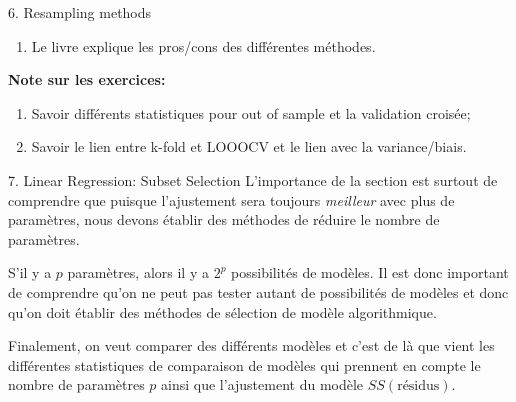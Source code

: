 \documentclass[12pt, titlepage, french]{report}
\begin{document}
\begin{CHPT_SUMM}{6. Resampling methods}
\begin{enumerate}
\begin{enumerate}
\begin{enumerate}
		\end{enumerate}
	\end{enumerate}
	\item	Le livre explique les pros/cons des différentes méthodes.
\end{enumerate}
\textbf{Note sur les exercices:} 
\begin{enumerate}
	\item	Savoir différents statistiques pour out of sample et la validation croisée;
	\item	Savoir le lien entre k-fold et LOOOCV et le lien avec la variance/biais.
\end{enumerate}
\end{CHPT_SUMM}

\begin{CHPT_SUMM}{7. Linear Regression:  Subset Selection}
L'importance de la section est surtout de comprendre que puisque l'ajustement sera toujours \textit{meilleur} avec plus de paramètres, nous devons établir des méthodes de réduire le nombre de paramètres. 

S'il y a $p$ paramètres, alors il y a $2^{p}$ possibilités de modèles. Il est donc important de comprendre qu'on ne peut pas tester autant de possibilités de modèles et donc qu'on doit établir des méthodes de sélection de modèle algorithmique.

Finalement, on veut comparer des différents modèles et c'est de là que vient les différentes statistiques de comparaison de modèles qui prennent en compte le nombre de paramètres $p$ ainsi que l'ajustement du modèle $SS(\text{résidus})$.


\end{CHPT_SUMM}
\end{document}
